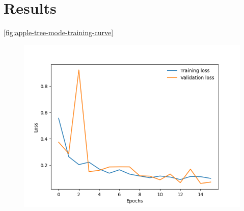 \section{Results}
\autoref{fig:apple-tree-mode-training-curve}
\begin{figure}[!h]
    \centering
    \includegraphics[width=\columnwidth,keepaspectratio]
    {./figures/mobile_model_apple_trees_16its_2022-11-15_training_curve}
    \caption{
    }
    \label{fig:apple-tree-mode-training-curve}
\end{figure}
